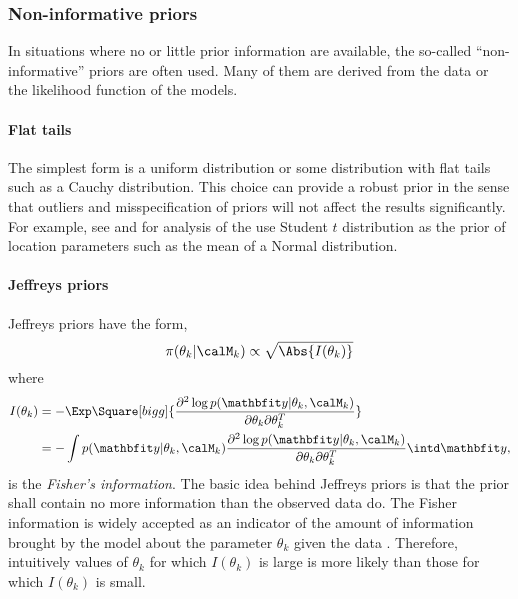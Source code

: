 \subsubsection{Non-informative priors}
\label{ssub:Non-informative priors}

In situations where no or little prior information are available, the
so-called ``non-informative'' priors are often used. Many of them are derived
from the data or the likelihood function of the models.

\paragraph{Flat tails}

The simplest form is a uniform distribution or some distribution with flat
tails such as a Cauchy distribution. This choice can provide a robust prior in
the sense that outliers and misspecification of priors will not affect the
results significantly. For example, see \cite{OHagan:1990vx} and
\cite{Fan:1992vx} for analysis of the use Student $t$ distribution as the
prior of location parameters such as the mean of a Normal distribution.

\paragraph{Jeffreys priors}

Jeffreys priors \cite{Jeffreys:1946jf} have the form,
\begin{equation}
  \pi(\theta_k|\calM_k)\propto\sqrt{\Abs{I(\theta_k)}}
\end{equation}
where
\begin{align}
  I(\theta_k)
  &= -\Exp\Square[bigg]{\frac{\partial^2\log p(\data|\theta_k,\calM_k)}
    {\partial\theta_k\partial\theta_k^T}} \notag\\
  &= -\int p(\data|\theta_k,\calM_k)
  \frac{\partial^2\log p (\data|\theta_k,\calM_k)}
  {\partial\theta_k\partial\theta_k^T}\intd\data,
\end{align}
is the \emph{Fisher's information}. The basic idea behind Jeffreys priors is
that the prior shall contain no more information than the observed data do.
The Fisher information is widely accepted as an indicator of the amount of
information brought by the model about the parameter $\theta_k$ given the data
\cite{Fisher:1956vx}. Therefore, intuitively values of $\theta_k$ for which
$I(\theta_k)$ is large is more likely than those for which $I(\theta_k)$ is
small.

